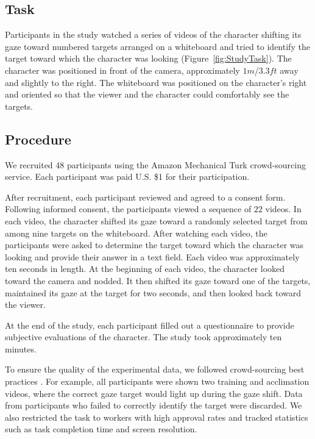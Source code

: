 \subsection{Task}

Participants in the study watched a series of videos of the character shifting its gaze toward numbered targets arranged on a whiteboard and tried to identify the target toward which the character was looking (Figure~\ref{fig:StudyTask}). The character was positioned in front of the camera, approximately $1 m$/$3.3 ft$ away and slightly to the right. The whiteboard was positioned on the character's right and oriented so that the viewer and the character could comfortably see the targets.

\subsection{Procedure}

We recruited 48 participants using the Amazon Mechanical Turk crowd-sourcing service. Each participant was paid U.S. \$1 for their participation.

After recruitment, each participant reviewed and agreed to a consent form. Following informed consent, the participants viewed a sequence of $22$ videos. In each video, the character shifted its gaze toward a randomly selected target from among nine targets on the whiteboard. After watching each video, the participants were asked to determine the target toward which the character was looking and provide their answer in a text field. Each video was approximately ten seconds in length. At the beginning of each video, the character looked toward the camera and nodded. It then shifted its gaze toward one of the targets, maintained its gaze at the target for two seconds, and then looked back toward the viewer.

At the end of the study, each participant filled out a questionnaire to provide subjective evaluations of the character. The study took approximately ten minutes.

To ensure the quality of the experimental data, we followed crowd-sourcing best practices \citep{kittur2008crowdsourcing}. For example, all participants were shown two training and acclimation videos, where the correct gaze target would light up during the gaze shift. Data from participants who failed to correctly identify the target were discarded. We also restricted the task to workers with high approval rates and tracked statistics such as task completion time and screen resolution.


